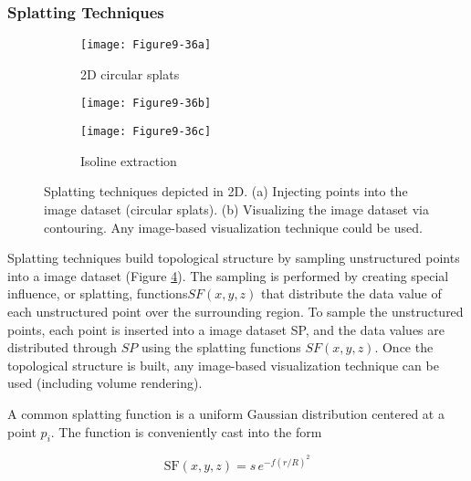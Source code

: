 \subsubsection{Splatting Techniques}
\label{subsubsec:splatting_techniques}

\begin{figure}[htb]
    \centering
	\begin{subfigure}[h]{0.36\linewidth}
		\texttt{[image: Figure9-36a]}
		\captionsetup{justification=centering}
		\caption{2D circular splats}
		\label{fig:Figure9-36a}
	\end{subfigure}
	\hfill
	\begin{subfigure}[h]{0.24\linewidth}
		\texttt{[image: Figure9-36b]}
		\captionsetup{justification=centering}
		\caption*{}
		\label{fig:Figure9-36b}
	\end{subfigure}
	\hfill
	\begin{subfigure}[h]{0.36\linewidth}
		\texttt{[image: Figure9-36c]}
		\captionsetup{justification=centering}
		\caption{Isoline extraction}
		\label{fig:Figure9-36c}
	\end{subfigure}
	\caption{Splatting techniques depicted in 2D. (a) Injecting points into the image dataset (circular splats). (b) Visualizing the image dataset via contouring. Any image-based visualization technique could be used.}\label{fig:Figure9-36}
\end{figure}


Splatting techniques build topological structure by sampling unstructured points into a image dataset (Figure \ref{fig:Figure9-36}). The sampling is performed by creating special influence, or splatting, functions$ SF(x,y,z)$ that distribute the data value of each unstructured point over the surrounding region. To sample the unstructured points, each point is inserted into a image dataset SP, and the data values are distributed through $SP$ using the splatting functions $SF(x,y,z)$. Once the topological structure is built, any image-based visualization technique can be used (including volume rendering).

A common splatting function is a uniform Gaussian distribution centered at a point $p_i$. The function is conveniently cast into the form

\begin{equation}\label{eq:9.22}
\text{SF}(x, y, z) = s\, e^{-f(r/R)^2}
\end{equation}

